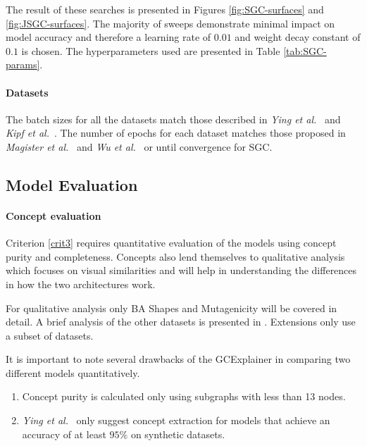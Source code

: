 The result of these searches is presented in Figures \ref{fig:SGC-surfaces} and \ref{fig:JSGC-surfaces}.
The majority of sweeps demonstrate minimal impact on model accuracy and therefore a learning rate of $0.01$ and weight decay constant of $0.1$ is chosen.
The hyperparameters used are presented in Table \ref{tab:SGC-params}.

%

\paragraph{Datasets}
The batch sizes for all the datasets match those described in \textit{Ying et al.}~\cite{ying2019gnnexplainer} and \textit{Kipf et al.}~\cite{kipf2016semi}.
The number of epochs for each dataset matches those proposed in \textit{Magister et al.}~\cite{magister2021gcexplainer} and \textit{Wu et al.}~\cite{wu2019simplifying} or until convergence for SGC.

\subsection{Model Evaluation}
\label{sec:evaluation}

\paragraph{Concept evaluation}
Criterion \ref{crit3} requires quantitative evaluation of the models using concept purity and completeness.
Concepts also lend themselves to qualitative analysis which focuses on visual similarities and will help in understanding the differences in how the two architectures work.

For qualitative analysis only BA Shapes and Mutagenicity will be covered in detail.
A brief analysis of the other datasets is presented in .
Extensions only use a subset of datasets.

It is important to note several drawbacks of the GCExplainer in comparing two different models quantitatively.
\begin{enumerate}
    \item 
        Concept purity is calculated only using subgraphs with less than 13 nodes.
    \item 
        \label{nb:accuracy}
        \textit{Ying et al.}~\cite{ying2019gnnexplainer} only suggest concept extraction for models that achieve an accuracy of at least $95\%$ on synthetic datasets. 
\end{enumerate}

